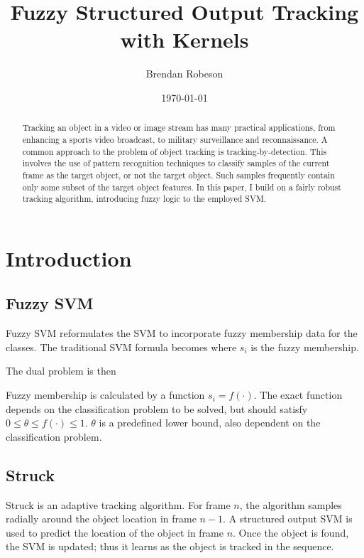 \documentclass{IEEEtran}
\begin{document}
\title{Fuzzy Structured Output Tracking with Kernels}
\author{Brendan Robeson}
\date{\today}
\maketitle

\begin{abstract} %
    Tracking an object in a video or image stream has many practical applications, from enhancing a
    sports video broadcast, to military surveillance and reconnaissance. A common approach to the
    problem of object tracking is tracking-by-detection. This involves the use of pattern
    recognition techniques to classify samples of the current frame as the target object, or not the
    target object. Such samples frequently contain only some subset of the target object features.
    In this paper, I build on a fairly robust tracking algorithm, introducing fuzzy logic to the
    employed SVM.
\end{abstract}

\section{Introduction} %

\subsection{Fuzzy SVM} %
Fuzzy SVM \cite{991432} reformulates the SVM to incorporate fuzzy membership data for the classes. The
traditional SVM formula
\svmEquation
becomes
\fuzzySvmEquation
where \(s_i\) is the fuzzy membership.

The dual problem is then
\fuzzyDual

Fuzzy membership is calculated by a function \(s_i = f(\cdot)\). The exact function depends on the
classification problem to be solved, but should satisfy \(0 \le \theta \le f(\cdot) \le 1\).
\(\theta\) is a predefined lower bound, also dependent on the classification problem.

\subsection{Struck} %
Struck \cite{6126251} is an adaptive tracking algorithm. For frame \(n\), the algorithm samples
radially around the object location in frame \(n-1\). A structured output SVM is used to predict the
location of the object in frame \(n\). Once the object is found, the SVM is updated; thus it learns as
the object is tracked in the sequence.
\end{document}
